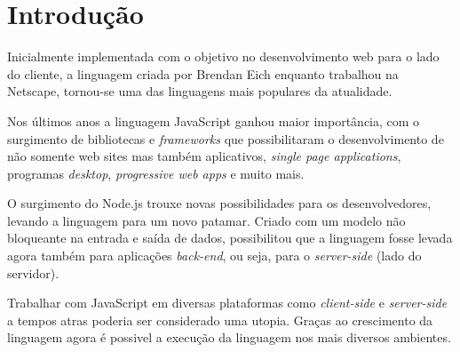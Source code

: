 \documentclass[
	12pt,				%
	openright,			%
	twoside,			%
	a4paper,			%
	english,			%
	brazil				%
	]{abntex2}
\begin{document}

\tableofcontents*
\cleardoublepage


\textual


\chapter{Introdução}

Inicialmente implementada com o objetivo no desenvolvimento web para o lado do cliente, a linguagem criada por Brendan Eich enquanto trabalhou na Netscape, tornou-se uma das linguagens mais populares da atualidade.

Nos últimos anos a linguagem JavaScript ganhou maior importância, com o surgimento de bibliotecas e \textit{frameworks} que possibilitaram o desenvolvimento de não somente web sites mas também aplicativos, \textit{single page applications}, programas \textit{desktop}, \textit{progressive web apps} e muito mais.

O surgimento do Node.js trouxe novas possibilidades para os desenvolvedores, levando a linguagem para um novo patamar. Criado com um modelo não bloqueante na entrada e saída de dados, possibilitou que a linguagem fosse levada agora também para aplicações \textit{back-end}, ou seja, para o \textit{server-side} (lado do servidor). %

Trabalhar com JavaScript em diversas plataformas como \textit{client-side} e \textit{server-side} a tempos atras poderia ser considerado uma utopia. Graças ao crescimento da linguagem agora é possivel a execução da linguagem nos mais diversos ambientes. %
\end{document}
